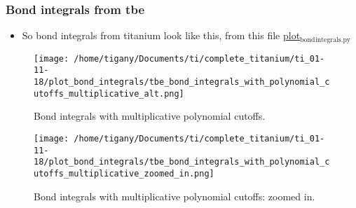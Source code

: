 \documentclass[11pt]{article}
\begin{document}
\subsubsection{Bond integrals from tbe}
\label{sec:org4f73f32}
\begin{itemize}
\item So bond integrals from titanium look like this, from this file
\href{file:///home/tigany/Documents/ti/complete\_titanium/ti\_01-11-18/plot\_bond\_integrals/plot\_bond\_integrals.py}{plot\(_{\text{bond}}\)\(_{\text{integrals.py}}\)}
\end{itemize}
\begin{figure}[htbp]
\centering
\texttt{[image: /home/tigany/Documents/ti/complete\_titanium/ti\_01-11-18/plot\_bond\_integrals/tbe\_bond\_integrals\_with\_polynomial\_cutoffs\_multiplicative\_alt.png]}
\caption{\label{fig:orgb9fb1d6}
Bond integrals with multiplicative polynomial cutoffs.}
\end{figure}
\begin{figure}[htbp]
\centering
\texttt{[image: /home/tigany/Documents/ti/complete\_titanium/ti\_01-11-18/plot\_bond\_integrals/tbe\_bond\_integrals\_with\_polynomial\_cutoffs\_multiplicative\_zoomed\_in.png]}
\caption{\label{fig:org4080250}
Bond integrals with multiplicative polynomial cutoffs: zoomed in.}
\end{figure}
\end{document}
